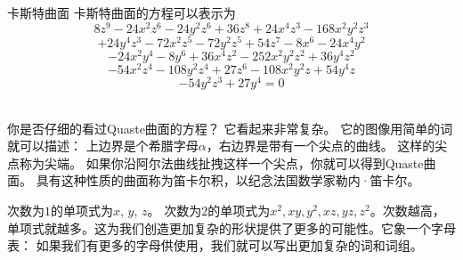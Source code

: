 ﻿\begin{surferPage}{卡斯特曲面}
卡斯特曲面的方程可以表示为 
  \smallskip
\[8z^9-24x^2z^6-24y^2z^6+36z^8+24x^4z^3-168x^2y^2z^3\]
\[+24y^4z^3-72x^2z^5-72y^2z^5+54z^7-8x^6-24x^4y^2\]
\[-24x^2y^4-8y^6 + 36x^4z^2-252x^2y^2z^2+36y^4z^2\]
\[- 54x^2z^4-108y^2z^4 + 27z^6-108x^2y^2z + 54y^4z\]
\[-54y^2z^3 + 27y^4 = 0\]\\
\vspace{0.3cm}

你是否仔细的看过Quaste曲面的方程？ 它看起来非常复杂。 它的图像用简单的词就可以描述： 上边界是个希腊字母$\alpha$，右边界是带有一个尖点的曲线。 这样的尖点称为尖端。 如果你沿阿尔法曲线扯拽这样一个尖点，你就可以得到Quaste曲面。 具有这种性质的曲面称为笛卡尔积，以纪念法国数学家勒内·笛卡尔。\\

\vspace{0.3cm}

次数为$1$的单项式为$x$, $y$, $z$。 次数为$2$的单项式为$x^2, xy, y^2, xz, yz, z^2$。次数越高，单项式就越多。这为我们创造更加复杂的形状提供了更多的可能性。它象一个字母表： 如果我们有更多的字母供使用，我们就可以写出更加复杂的词和词组。
\end{surferPage}

